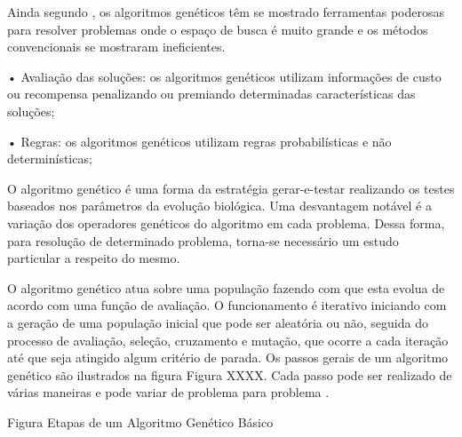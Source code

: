 \documentclass{abntpuc}
\begin{document}
Ainda segundo \cite{oliveira2005algoritmo}, os algoritmos genéticos têm se mostrado ferramentas poderosas para resolver problemas onde o espaço de busca é muito grande e os métodos convencionais se mostraram ineficientes.\par


•  Avaliação das soluções: os algoritmos genéticos utilizam informações de custo ou recompensa penalizando ou premiando determinadas características das soluções; \par

•  Regras: os algoritmos genéticos utilizam regras probabilísticas e não determinísticas; \par

O algoritmo genético é uma forma da estratégia gerar-e-testar realizando os testes baseados nos parâmetros da evolução biológica. Uma desvantagem notável é a variação dos operadores genéticos do algoritmo em cada problema. Dessa forma, para resolução de determinado problema, torna-se necessário um estudo particular a respeito do mesmo. \par

O algoritmo genético atua sobre uma população fazendo com que esta evolua de acordo com uma função de avaliação. O funcionamento é iterativo iniciando com a geração de uma população inicial que pode ser aleatória ou não, seguida do processo de avaliação, seleção, cruzamento e mutação, que ocorre a cada iteração até que seja atingido algum critério de parada. Os passos gerais de um algoritmo genético são ilustrados na figura 
Figura XXXX. Cada passo pode ser realizado de várias maneiras e pode variar de problema para problema \cite{timoteo2005desenvolvimento}.\par 

Figura Etapas de um Algoritmo Genético Básico 

%
%
%
%
\end{document}
